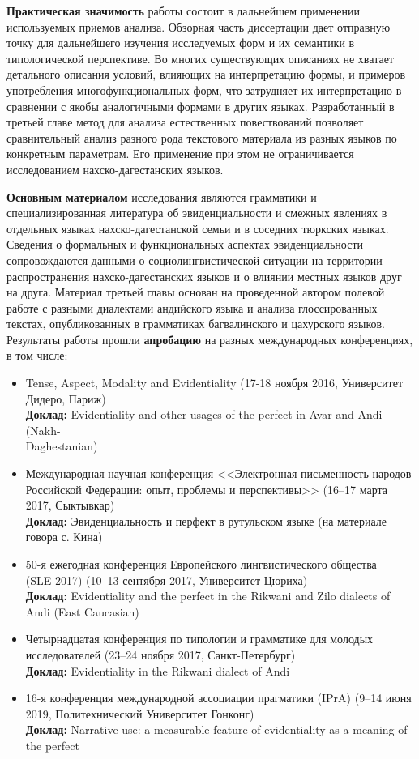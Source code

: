 \textbf{Практическая значимость} работы состоит в дальнейшем применении используемых приемов анализа. Обзорная часть диссертации дает отправную точку для дальнейшего изучения исследуемых форм и их семантики в типологической перспективе. Во многих существующих описаниях не хватает детального описания условий, влияющих на интерпретацию формы, и примеров употребления многофункциональных форм, что затрудняет их интерпретацию в сравнении с якобы аналогичными формами в других языках. Разработанный в третьей главе метод для анализа естественных повествований позволяет сравнительный анализ разного рода текстового материала из разных языков по конкретным параметрам. Его применение при этом не ограничивается исследованием нахско-дагестанских языков.
\par \textbf{Основным материалом} исследования являются грамматики и специализированная литература об эвиденциальности и смежных явлениях в отдельных языках нахско-дагестанской семьи и в соседних тюркских языках. Сведения о формальных и функциональных аспектах эвиденциальности сопровождаются данными о социолингвистической ситуации на территории распространения нахско-дагестанских языков и о влиянии местных языков друг на друга. Материал третьей главы основан на проведенной автором полевой работе с разными диалектами андийского языка и анализа глоссированных текстах, опубликованных в грамматиках багвалинского и цахурского языков. Результаты работы прошли \textbf{апробацию} на разных международных конференциях, в том числе:

\begin{itemize}
    \item Tense, Aspect, Modality and Evidentiality (17-18 ноября 2016, Университет Дидеро, Париж) \\
    \textbf{Доклад:} Evidentiality and other usages of the perfect in Avar and Andi (Nakh-\\Daghestanian)
    \item Международная научная конференция <<Электронная письменность народов Российской Федерации: опыт, проблемы и перспективы>> (16--17 марта 2017, Сыктывкар) \\
    \textbf{Доклад:} Эвиденциальность и перфект в рутульском языке (на материале говора с. Кина)
    \item 50-я ежегодная конференция Европейского лингвистического общества \\ (SLE 2017) (10--13 сентября 2017, Университет Цюриха) \\
    \textbf{Доклад:} Evidentiality and the perfect in the Rikwani and Zilo dialects of Andi (East Caucasian)
    \item Четырнадцатая конференция по типологии и грамматике для молодых исследователей (23--24 ноября 2017, Санкт-Петербург) \\
    \textbf{Доклад:} Evidentiality in the Rikwani dialect of Andi
    \item 16-я конференция международной ассоциации прагматики (IPrA) (9--14 июня 2019, Политехнический Университет Гонконг) \\
    \textbf{Доклад:} Narrative use: a measurable feature of evidentiality as a meaning of the perfect
\end{itemize}

